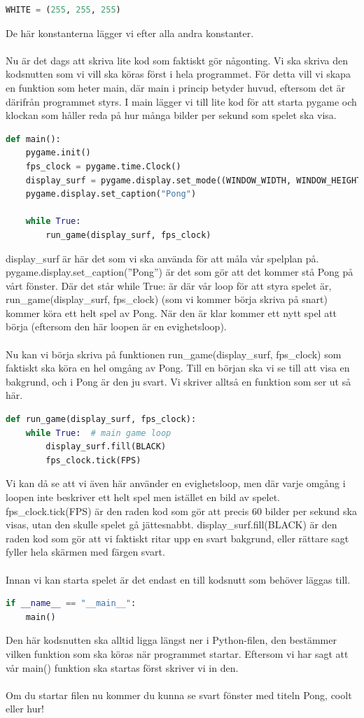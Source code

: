 \documentclass{article}
\begin{document}
\begin{lstlisting}[language=Python]
WHITE = (255, 255, 255)
\end{lstlisting}
De här konstanterna lägger vi efter alla andra konstanter.\\
\\
Nu är det dags att skriva lite kod som faktiskt gör någonting. Vi ska skriva den kodsnutten som vi vill ska köras först i hela programmet. För detta vill vi skapa en funktion som heter main, där main i princip betyder huvud, eftersom det är därifrån programmet styrs. I main lägger vi till lite kod för att starta pygame och klockan som håller reda på hur många bilder per sekund som spelet ska visa.
\begin{lstlisting}[language=Python]
def main():
    pygame.init()
    fps_clock = pygame.time.Clock()
    display_surf = pygame.display.set_mode((WINDOW_WIDTH, WINDOW_HEIGHT))
    pygame.display.set_caption("Pong")

    while True:
        run_game(display_surf, fps_clock)
\end{lstlisting}
display\_surf är här det som vi ska använda för att måla vår spelplan på. pygame.display.set\_caption(''Pong'') är det som gör att det kommer stå Pong på vårt fönster. Där det står while True: är där vår loop för att styra spelet är, run\_game(display\_surf, fps\_clock) (som vi kommer börja skriva på snart) kommer köra ett helt spel av Pong. När den är klar kommer ett nytt spel att börja (eftersom den här loopen är en evighetsloop).\\
\\
Nu kan vi börja skriva på funktionen run\_game(display\_surf, fps\_clock) som faktiskt ska köra en hel omgång av Pong. Till en början ska vi se till att visa en bakgrund, och i Pong är den ju svart. Vi skriver alltså en funktion som ser ut så här.
\begin{lstlisting}[language=Python]
def run_game(display_surf, fps_clock):
    while True:  # main game loop
        display_surf.fill(BLACK)
        fps_clock.tick(FPS)
\end{lstlisting}
Vi kan då se att vi även här använder en evighetsloop, men där varje omgång i loopen inte beskriver ett helt spel men istället en bild av spelet. fps\_clock.tick(FPS) är den raden kod som gör att precis 60 bilder per sekund ska visas, utan den skulle spelet gå jättesnabbt. display\_surf.fill(BLACK) är den raden kod som gör att vi faktiskt ritar upp en svart bakgrund, eller rättare sagt fyller hela skärmen med färgen svart.\\
\\
Innan vi kan starta spelet är det endast en till kodsnutt som behöver läggas till.
\begin{lstlisting}[language=Python]
if __name__ == "__main__":
	main()
\end{lstlisting}
Den här kodsnutten ska alltid ligga längst ner i Python-filen, den bestämmer vilken funktion som ska köras när programmet startar. Eftersom vi har sagt att vår main() funktion ska startas först skriver vi in den.\\
\\
Om du startar filen nu kommer du kunna se svart fönster med titeln Pong, coolt eller hur!


\newpage

\end{document}
